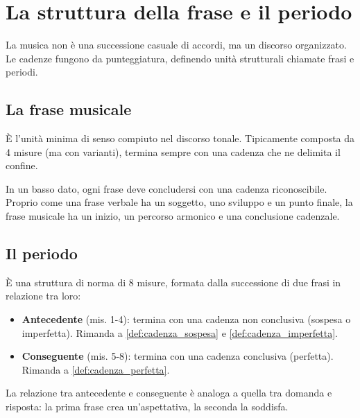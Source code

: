 \chapter{La struttura della frase e il periodo}
\label{chap:struttura_frase}

La musica non è una successione casuale di accordi, ma un discorso organizzato. Le cadenze fungono da punteggiatura, definendo unità strutturali chiamate frasi e periodi.

\section{La frase musicale}
\label{sec:frase_musicale}

\begin{definizione}
    È l'unità minima di senso compiuto nel discorso tonale. Tipicamente composta da 4 misure (ma con varianti), termina sempre con una cadenza che ne delimita il confine.
\end{definizione}

\begin{regola}
    In un basso dato, ogni frase deve concludersi con una cadenza riconoscibile. Proprio come una frase verbale ha un soggetto, uno sviluppo e un punto finale, la frase musicale ha un inizio, un percorso armonico e una conclusione cadenzale.
\end{regola}

\section{Il periodo}
\label{sec:periodo}

\begin{definizione}[Il periodo]
    È una struttura di norma di 8 misure, formata dalla successione di due frasi in relazione tra loro:
    \begin{itemize}
        \item \textbf{Antecedente} (mis. 1-4): termina con una cadenza non conclusiva (sospesa o imperfetta). Rimanda a \ref{def:cadenza_sospesa} e \ref{def:cadenza_imperfetta}.
        \item \textbf{Conseguente} (mis. 5-8): termina con una cadenza conclusiva (perfetta). Rimanda a \ref{def:cadenza_perfetta}.
    \end{itemize}
\end{definizione}

La relazione tra antecedente e conseguente è analoga a quella tra domanda e risposta: la prima frase crea un'aspettativa, la seconda la soddisfa.

